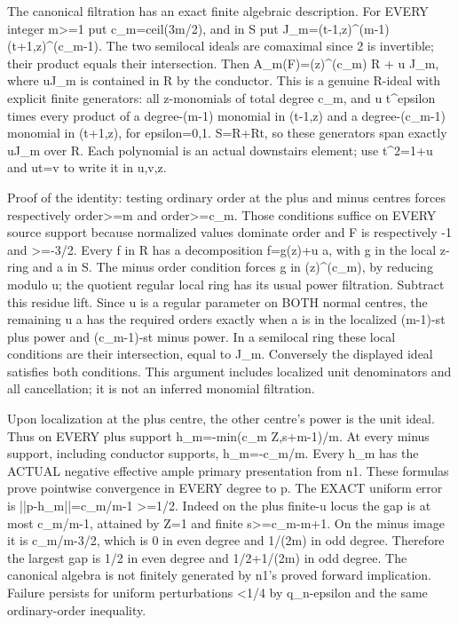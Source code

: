 The canonical filtration has an exact finite algebraic description. For EVERY integer m\textgreater{}=1 put c\_m=ceil(3m/2), and in S put
J\_m=(t-1,z)\textasciicircum{}(m-1)(t+1,z)\textasciicircum{}(c\_m-1).
The two semilocal ideals are comaximal since 2 is invertible; their product equals their intersection. Then
A\_m(F)=(z)\textasciicircum{}(c\_m) R + u J\_m,
where uJ\_m is contained in R by the conductor. This is a genuine R-ideal with explicit finite generators: all z-monomials of total degree c\_m, and u t\textasciicircum{}epsilon times every product of a degree-(m-1) monomial in (t-1,z) and a degree-(c\_m-1) monomial in (t+1,z), for epsilon=0,1. S=R+Rt, so these generators span exactly uJ\_m over R. Each polynomial is an actual downstairs element; use t\textasciicircum{}2=1+u and ut=v to write it in u,v,z.

Proof of the identity: testing ordinary order at the plus and minus centres forces respectively order\textgreater{}=m and order\textgreater{}=c\_m. Those conditions suffice on EVERY source support because normalized values dominate order and F is respectively -1 and \textgreater{}=-3/2. Every f in R has a decomposition f=g(z)+u a, with g in the local z-ring and a in S. The minus order condition forces g in (z)\textasciicircum{}(c\_m), by reducing modulo u; the quotient regular local ring has its usual power filtration. Subtract this residue lift. Since u is a regular parameter on BOTH normal centres, the remaining u a has the required orders exactly when a is in the localized (m-1)-st plus power and (c\_m-1)-st minus power. In a semilocal ring these local conditions are their intersection, equal to J\_m. Conversely the displayed ideal satisfies both conditions. This argument includes localized unit denominators and all cancellation; it is not an inferred monomial filtration.

Upon localization at the plus centre, the other centre's power is the unit ideal. Thus on EVERY plus support
h\_m=-min(c\_m Z,s+m-1)/m.
At every minus support, including conductor supports, h\_m=-c\_m/m. Every h\_m has the ACTUAL negative effective ample primary presentation from n1. These formulas prove pointwise convergence in EVERY degree to p. The EXACT uniform error is
||p-h\_m||=c\_m/m-1 \textgreater{}=1/2.
Indeed on the plus finite-u locus the gap is at most c\_m/m-1, attained by Z=1 and finite s\textgreater{}=c\_m-m+1. On the minus image it is c\_m/m-3/2, which is 0 in even degree and 1/(2m) in odd degree. Therefore the largest gap is 1/2 in even degree and 1/2+1/(2m) in odd degree. The canonical algebra is not finitely generated by n1's proved forward implication. Failure persists for uniform perturbations \textless{}1/4 by q\_n-epsilon and the same ordinary-order inequality.

